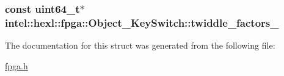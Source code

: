 \hypertarget{structintel_1_1hexl_1_1fpga_1_1Object__KeySwitch_adbd1e4578cfb016b582d0bbefee8fe6f}{
\subsubsection[{twiddle\-\_\-factors\-\_\-}]{\setlength{\rightskip}{0pt plus 5cm}const uint64\-\_\-t$\ast$ intel\-::hexl\-::fpga\-::\-Object\-\_\-\-Key\-Switch\-::twiddle\-\_\-factors\-\_\-}}\label{structintel_1_1hexl_1_1fpga_1_1Object__KeySwitch_adbd1e4578cfb016b582d0bbefee8fe6f}


The documentation for this struct was generated from the following file\-:\begin{DoxyCompactItemize}
\item 
\hyperlink{fpga_8h}{fpga.\-h}\end{DoxyCompactItemize}
